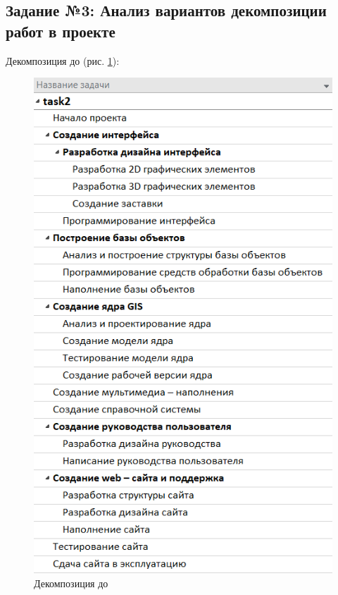 \subsection*{Задание №3: Анализ вариантов декомпозиции работ в проекте}
Декомпозиция до (рис. \ref{p6}):
\begin{figure}[!h]
	\centering
	\includegraphics[width=0.7\linewidth]{inc/img/6.png}
	\caption{Декомпозиция до}
	\label{p6}
\end{figure}


